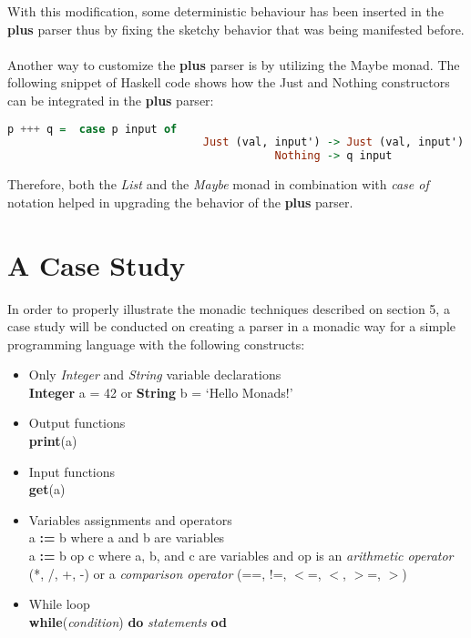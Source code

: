 \documentclass[a4paper, onecolumn]{article}
\begin{document}
     \noindent With this modification, some deterministic behaviour has been inserted in the \textbf{plus} parser thus by fixing the sketchy behavior that was being manifested before. \\ \\
     Another way to customize the \textbf{plus} parser is by utilizing the Maybe monad. The following snippet of Haskell code shows how the Just and Nothing constructors can be integrated in the \textbf{plus} parser:
     
     \begin{tcolorbox}
    \begin{lstlisting}[language=Haskell] 
        p +++ q =  case p input of
                              Just (val, input') -> Just (val, input')
                                         Nothing -> q input
    \end{lstlisting}
    \end{tcolorbox}
    
    Therefore, both the \textit{List} and the \textit{Maybe} monad in combination with \textit{case of} notation helped in upgrading the behavior of the \textbf{plus} parser. 
    
    \section{A Case Study}
    
    In order to properly illustrate the monadic techniques described on section 5, a case study will be conducted on creating a parser in a monadic way for a simple programming language with the following constructs: 
    
    \begin{itemize}
        \item Only \textit{Integer} and \textit{String} variable declarations \\
        \textbf{Integer} a = 42 or \textbf{String} b = `Hello Monads!'
        \item Output functions \\ 
        \textbf{print}(a)
        \item Input functions \\
        \textbf{get}(a)
        \item Variables assignments and operators \\ 
        a \textbf{:=} b where a and b are variables \\ 
        a \textbf{:=} b op c where a, b, and c are variables and op is an \textit{arithmetic operator} (*, /, +, -) or a \textit{comparison operator} (==, !=, $<$=, $<$, $>$=, $>$) 
        \item While loop \\ 
        \textbf{while}(\textit{condition}) \textbf{do} \textit{statements} \textbf{od}
    \end{itemize}
    
\end{document}
